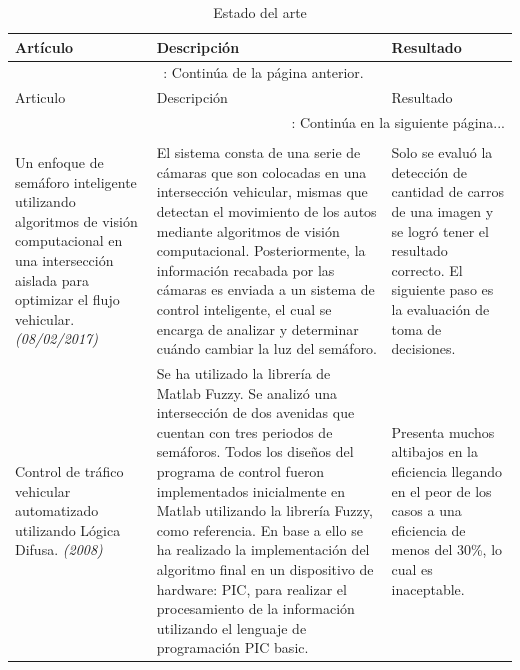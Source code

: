 \begin{center}
	\begin{longtable}{|p{2.7cm}|p{7cm}|p{5.0cm}|}
		

		
		\hline Artículo & Descripción & Resultado \\ \hline
		\endfirsthead
		
		\multicolumn{3}{c}{{\tablename\ \thetable{}: Continúa de la página anterior.}}\\

		\hline Articulo & Descripción & Resultado \\ \hline
		\endhead
		
		\multicolumn{3}{r}{{\tablename\ \thetable{}: Continúa en la siguiente página...}}\\
		\endfoot
		
		\caption[Estado del Arte]{Estado del arte}\label{table:estadodelarte}\\
		\endlastfoot
		

		
		Un enfoque de semáforo inteligente utilizando algoritmos de visión computacional en una intersección aislada para optimizar el flujo vehicular.\cite{garciag} \newline \emph{(08/02/2017)} &
		El sistema consta de una serie de cámaras que son colocadas en una intersección vehicular, mismas que detectan el movimiento de los autos mediante algoritmos de visión computacional.
		Posteriormente, la información recabada por las cámaras es enviada a un sistema de control inteligente, el cual se encarga de analizar y determinar cuándo cambiar la luz del semáforo.&
		Solo se evaluó la detección de cantidad de carros de una imagen y se logró tener el resultado correcto. El siguiente paso es la evaluación de toma de decisiones.\\ \hline
		
		
		Control de tráfico vehicular automatizado utilizando Lógica Difusa.\cite{alvaroer} \newline \emph{(2008)} &
		Se ha utilizado la librería de Matlab Fuzzy. Se analizó una intersección de dos avenidas que cuentan con tres periodos de semáforos.  Todos los diseños del programa de control fueron implementados inicialmente en Matlab utilizando la librería Fuzzy, como referencia. En base a ello se ha realizado la implementación del algoritmo final en un dispositivo de hardware: PIC, para realizar el procesamiento de la información utilizando el lenguaje de programación PIC basic.&
		Presenta muchos altibajos en la eficiencia llegando en el peor de los casos a una eficiencia de menos del 30\%, lo cual es inaceptable.\\ \hline
		

\end{longtable}
\end{center}
